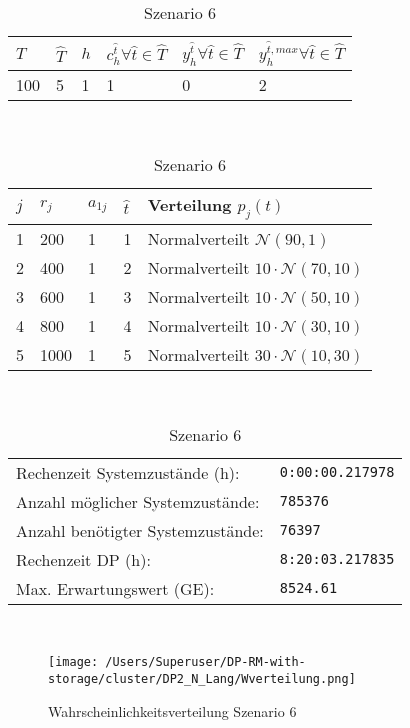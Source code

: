 \begin{table}[h!]
\renewcommand{\arraystretch}{1.5}
  \begin{center}
    \caption{Szenario 6}  \label{S6}
    \vspace*{3mm}
    \begin{tabular}{l l l l l l}   %
    $T$ & $\hat T$  & $h$ & $c_h^{\hat t}\forall \hat{t}\in{\hat T}$ & $y_h^{\hat t}\forall \hat{t}\in{\hat T}$  & $y_h^{{\hat t},max}\forall \hat{t}\in{\hat T}$  \\  \hline
100 & 5 & 1 & 1 & 0 & 2  \\ \hline
    \end{tabular} \\[3mm]
        \begin{tabular}{p{1cm} p{1cm} p{1cm}  p{1cm} p{6cm}}   %
    $j$ & $r_j$  & $a_{1j}$ & $\hat t$ & Verteilung $p_j(t)$ \\  \hline
1 & 200 & 1 & 1 & Normalverteilt $\mathcal{N}(90, 1)$   \\
2 & 400 & 1 & 2 & Normalverteilt $10\cdot\mathcal{N}(70, 10)$  \\
3 & 600 & 1 & 3 & Normalverteilt $10\cdot\mathcal{N}(50, 10)$  \\
4 & 800 & 1 & 4 & Normalverteilt $10\cdot\mathcal{N}(30, 10)$  \\
5 & 1000 & 1 & 5 & Normalverteilt $30\cdot\mathcal{N}(10, 30)$ \\
\hline
    \end{tabular} \\[3mm]
     \begin{tabular}{p{7cm}p{5cm}} \hline
     Rechenzeit Systemzustände (h): & \texttt{0:00:00.217978} \\
     Anzahl möglicher Systemzustände: & \texttt{785376} \\
     Anzahl benötigter Systemzustände: & \texttt{76397} \\ 
     Rechenzeit DP (h): & \texttt{8:20:03.217835} \\ 
          Max. Erwartungswert (GE): & \texttt{8524.61} \\ \hline
         \end{tabular} \\[3mm]
  \end{center}
\end{table}

\begin{figure}[h!]
  \begin{center}
    \texttt{[image: /Users/Superuser/DP-RM-with-storage/cluster/DP2\_N\_Lang/Wverteilung.png]}
    \caption{Wahrscheinlichkeitsverteilung Szenario 6}  \label{SB6}
  \end{center}
\end{figure}


